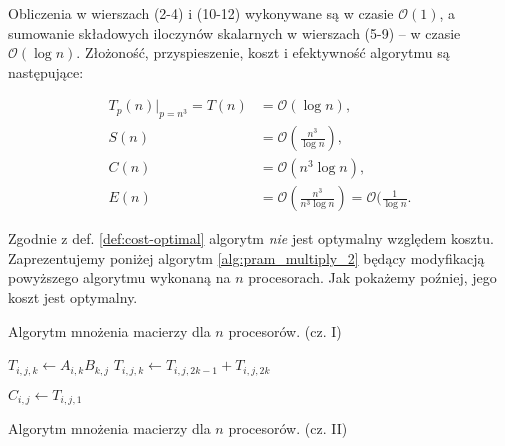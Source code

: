 Obliczenia w wierszach (2-4) i (10-12) wykonywane są w czasie \(\mathcal{O}(1)\), a sumowanie składowych iloczynów skalarnych w wierszach (5-9) -- w czasie \(\mathcal{O}(\log{n})\). Złożoność, przyspieszenie, koszt i efektywność algorytmu są następujące\cite{Czech}:

\begin{align*}
T_p(n)|_{p=n^3} = T(n) &= \mathcal{O}(\log{n}), \\
S(n) &= \mathcal{O}(\frac{n^3}{\log{n}}), \\
C(n) &= \mathcal{O}(n^3 \log{n}), \\
E(n) &= \mathcal{O}(\frac{n^3}{n^3 \log{n}})=\mathcal{O}(\frac{1}{\log{n}}.
\end{align*}

\noindent Zgodnie z def. \ref{def:cost-optimal} algorytm \emph{nie} jest optymalny względem kosztu. Zaprezentujemy poniżej algorytm \ref{alg:pram_multiply_2} będący modyfikacją powyższego algorytmu wykonaną na \(n\) procesorach. Jak pokażemy poźniej, jego koszt jest optymalny.


\begin{algorithm}[H]
\centering
\begin{algorithmic}[1]
\end{algorithmic}
\caption{Algorytm mnożenia macierzy dla \(n\) procesorów.\cite{Czech} (cz. I)}
\label{alg:pram_multiply_2}
\end{algorithm}

\begin{algorithm}[H]
\centering
\begin{algorithmic}[1]		
			\State \(T_{i,j,k} \gets A_{i,k}B_{k,j}\)
		\EndFor
	\EndFor
\EndParFor
{} 
				\State \(T_{i,j,k} \gets T_{i,j,2k-1}+T_{i,j,2k}\)
			\EndFor
		\EndFor
	\EndParFor
\EndFor

		\State \(C_{i,j} \gets T_{i,j,1} \)
	\EndFor
\EndParFor
\end{algorithmic}
\caption{Algorytm mnożenia macierzy dla \(n\) procesorów.\cite{Czech} (cz. II)}
\label{alg:pram_multiply_2}
\end{algorithm}


